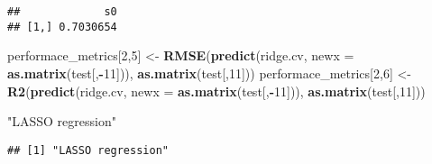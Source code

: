 \documentclass[
]{article}
\newenvironment{Shaded}{\begin{snugshade}}{\end{snugshade}}
\newcommand{\DataTypeTok}[1]{\textcolor[rgb]{0.13,0.29,0.53}{#1}}
\newcommand{\DecValTok}[1]{\textcolor[rgb]{0.00,0.00,0.81}{#1}}
\newcommand{\KeywordTok}[1]{\textcolor[rgb]{0.13,0.29,0.53}{\textbf{#1}}}
\newcommand{\NormalTok}[1]{#1}
\newcommand{\OperatorTok}[1]{\textcolor[rgb]{0.81,0.36,0.00}{\textbf{#1}}}
\newcommand{\StringTok}[1]{\textcolor[rgb]{0.31,0.60,0.02}{#1}}
\begin{document}
\begin{verbatim}
##             s0
## [1,] 0.7030654
\end{verbatim}

\begin{Shaded}
\begin{Highlighting}[]
\NormalTok{performace_metrics[}\DecValTok{2}\NormalTok{,}\DecValTok{5}\NormalTok{] <-}\StringTok{ }\KeywordTok{RMSE}\NormalTok{(}\KeywordTok{predict}\NormalTok{(ridge.cv, }\DataTypeTok{newx =} \KeywordTok{as.matrix}\NormalTok{(test[,}\OperatorTok{-}\DecValTok{11}\NormalTok{])), }\KeywordTok{as.matrix}\NormalTok{(test[,}\DecValTok{11}\NormalTok{])) }
\NormalTok{performace_metrics[}\DecValTok{2}\NormalTok{,}\DecValTok{6}\NormalTok{] <-}\StringTok{ }\KeywordTok{R2}\NormalTok{(}\KeywordTok{predict}\NormalTok{(ridge.cv, }\DataTypeTok{newx =} \KeywordTok{as.matrix}\NormalTok{(test[,}\OperatorTok{-}\DecValTok{11}\NormalTok{])), }\KeywordTok{as.matrix}\NormalTok{(test[,}\DecValTok{11}\NormalTok{]))}


\StringTok{"LASSO regression"}
\end{Highlighting}
\end{Shaded}

\begin{verbatim}
## [1] "LASSO regression"
\end{verbatim}

\begin{Shaded}
\end{Shaded}
\end{document}
